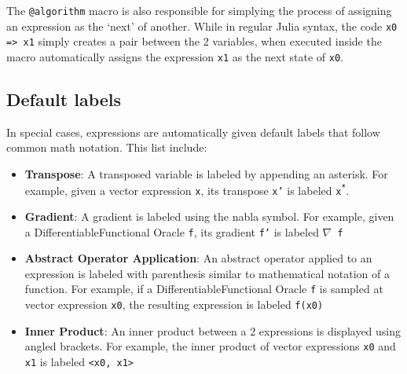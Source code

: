 The \texttt{@algorithm} macro is also responsible for simplying the process of assigning an expression as the `next' of another. While in regular Julia syntax, the code \texttt{x0 => x1} simply creates a pair between the 2 variables, when executed inside the macro automatically assigns the expression \texttt{x1} as the next state of \texttt{x0}.

\subsection*{Default labels}
In special cases, expressions are automatically given default labels that follow common math notation. This list include:

\begin{itemize}
    \item \textbf{Transpose}: A transposed variable is labeled by appending an asterisk.
    For example, given a vector expression \texttt{x}, its transpose \texttt{x'} is labeled \texttt{x\textsuperscript{*}}.

    \item \textbf{Gradient}: A gradient is labeled using the nabla symbol. For example, given a DifferentiableFunctional Oracle \texttt{f}, its gradient \texttt{f'}  is labeled \texttt{$\nabla$ f}


    \item \textbf{Abstract Operator Application}: An abstract operator applied to an expression is labeled with parenthesis similar to mathematical notation of a function. For example, if a DifferentiableFunctional Oracle \texttt{f} is sampled at vector expression \texttt{x0}, the resulting expression is labeled \texttt{f(x0)}


    \item \textbf{Inner Product}: An inner product between a 2 expressions is displayed using angled brackets. For example, the inner product of vector expressions \texttt{x0} and \texttt{x1} is labeled \texttt{<x0, x1>}
    

\end{itemize}
